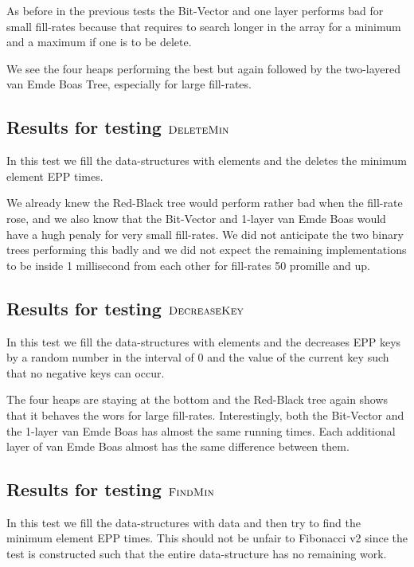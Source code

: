 \documentclass[oneside,11pt,openright]{report}
\newcommand{\FindMin}{\textsc{FindMin}}
\newcommand{\DeleteMin}{\textsc{DeleteMin}}
\newcommand{\DecreaseKey}{\textsc{DecreaseKey}}
\begin{document}


As before in the previous tests the Bit-Vector and one layer performs bad for small fill-rates because that requires to search longer in the array for a minimum and a maximum if one is to be delete.

We see the four heaps performing the best but again followed by the two-layered van Emde Boas Tree, especially for large fill-rates.

\subsection{Results for testing $\DeleteMin$}

In this test we fill the data-structures with elements and the deletes the minimum element EPP times.



We already knew the Red-Black tree would perform rather bad when the fill-rate rose, and we also know that the Bit-Vector and 1-layer van Emde Boas would have a hugh penaly for very small fill-rates. We did not anticipate the two binary trees performing this badly and we did not expect the remaining implementations to be inside 1 millisecond from each other for fill-rates 50 promille and up.

\subsection{Results for testing $\DecreaseKey$}

In this test we fill the data-structures with elements and the decreases EPP keys by a random number in the interval of 0 and the value of the current key such that no negative keys can occur.



The four heaps are staying at the bottom and the Red-Black tree again shows that it behaves the wors for large fill-rates. Interestingly, both the Bit-Vector and the 1-layer van Emde Boas has almost the same running times. Each additional layer of van Emde Boas almost has the same difference between them.

\subsection{Results for testing $\FindMin$}

In this test we fill the data-structures with data and then try to find the minimum element EPP times. This should not be unfair to Fibonacci v2 since the test is constructed such that the entire data-structure has no remaining work.
\end{document}

